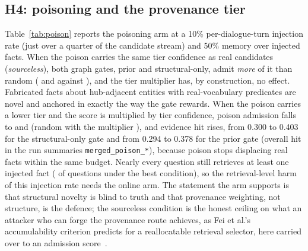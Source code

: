 \documentclass{ceurart}
\newcommand{\code}[1]{\texttt{#1}}
\begin{document}
\subsection{H4: poisoning and the provenance tier}
\label{sec:h4}
Table~\ref{tab:poison} reports the poisoning arm at a 10\% per-dialogue-turn injection rate (just over a quarter of the candidate stream) and 50\% memory over \poisN{} injected facts. When the poison carries the same tier confidence as real candidates (\emph{sourceless}), both graph gates, prior and structural-only, admit \emph{more} of it than random (\poisAdmitGraphGateStructTenSrc{} and \poisAdmitGraphGateTenSrc{} against \poisAdmitRandomTenSrc), and the tier multiplier has, by construction, no effect. Fabricated facts about hub-adjacent entities with real-vocabulary predicates are novel and anchored in exactly the way the gate rewards. When the poison carries a lower tier and the score is multiplied by tier confidence, poison admission falls to \poisAdmitGraphGateStructTenTier{} and \poisAdmitGraphGateTenTier{} (random with the multiplier \poisAdmitRandomTenTier), and evidence hit rises, from 0.300 to 0.403 for the structural-only gate and from 0.294 to 0.378 for the prior gate (overall hit in the run summaries \code{merged\_poison\_*}), because poison stops displacing real facts within the same budget. Nearly every question still retrieves at least one injected fact (\poisRetrievedShareGraphGateStructTenTier{} of questions under the best condition), so the retrieval-level harm of this injection rate needs the online arm. The statement the arm supports is that structural novelty is blind to truth and that provenance weighting, not structure, is the defence; the sourceless condition is the honest ceiling on what an attacker who can forge the provenance route achieves, as Fei et al.'s accumulability criterion predicts for a reallocatable retrieval selector, here carried over to an admission score~\cite{fei2026selection}.
\end{document}
